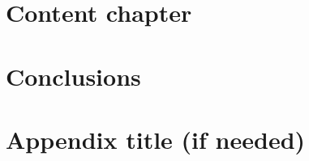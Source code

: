 \documentclass[12pt, oneside]{book}
\begin{document}
\chapter{Content chapter}



\chapter{Conclusions}


\appendix 


\chapter{Appendix title (if needed)}


\chapter{}








\end{document}
